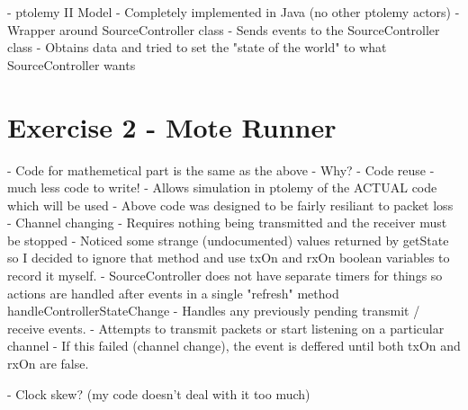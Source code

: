 \documentclass[a4paper,12pt,draft,DIV=calc]{scrartcl}
\begin{document}
- ptolemy II Model
  - Completely implemented in Java (no other ptolemy actors)
  - Wrapper around SourceController class
  - Sends events to the SourceController class
  - Obtains data and tried to set the "state of the world" to what
    SourceController wants

\section{Exercise 2 - Mote Runner}
- Code for mathemetical part is the same as the above
  - Why?
    - Code reuse - much less code to write!
    - Allows simulation in ptolemy of the ACTUAL code which will be used
    - Above code was designed to be fairly resiliant to packet loss
- Channel changing
  - Requires nothing being transmitted and the receiver must be stopped
    - Noticed some strange (undocumented) values returned by getState so I
      decided to ignore that method and use txOn and rxOn boolean variables to
      record it myself.
- SourceController does not have separate timers for things so actions are
  handled after events in a single "refresh" method handleControllerStateChange
  - Handles any previously pending transmit / receive events.
  - Attempts to transmit packets or start listening on a particular channel
  - If this failed (channel change), the event is deffered until both txOn
    and rxOn are false.

- Clock skew? (my code doesn't deal with it too much)
\end{document}
